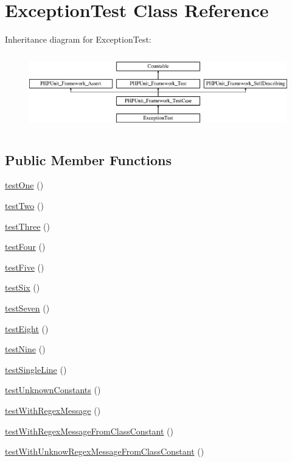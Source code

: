 \hypertarget{class_exception_test}{}\section{Exception\+Test Class Reference}
\label{class_exception_test}
Inheritance diagram for Exception\+Test\+:\begin{figure}[H]
\begin{center}
\leavevmode
\includegraphics[height=3.303835cm]{class_exception_test}
\end{center}
\end{figure}
\subsection*{Public Member Functions}
\begin{DoxyCompactItemize}
\item 
\mbox{\hyperlink{class_exception_test_afbf3ff88b322c6a7197ce02297cd23a0}{test\+One}} ()
\item 
\mbox{\hyperlink{class_exception_test_a4fb9974ce113d5d1db8075e0db0dc9b6}{test\+Two}} ()
\item 
\mbox{\hyperlink{class_exception_test_a0bd6c752e665cd0e690512ca38d15d41}{test\+Three}} ()
\item 
\mbox{\hyperlink{class_exception_test_a610ae959d988c18c588f47517f6a291f}{test\+Four}} ()
\item 
\mbox{\hyperlink{class_exception_test_a0756440631c4db21ab3607063465834a}{test\+Five}} ()
\item 
\mbox{\hyperlink{class_exception_test_ace022eea5b5fa83b441021bf6337a76b}{test\+Six}} ()
\item 
\mbox{\hyperlink{class_exception_test_afac89d452a2d5de36e0051d1ed758b24}{test\+Seven}} ()
\item 
\mbox{\hyperlink{class_exception_test_a9716ac1cbf30a1f6df13338c87f06191}{test\+Eight}} ()
\item 
\mbox{\hyperlink{class_exception_test_a80538b5f401ca6c091eabea9fb507c00}{test\+Nine}} ()
\item 
\mbox{\hyperlink{class_exception_test_a4c90a8d3690532dd044c150c200bd7da}{test\+Single\+Line}} ()
\item 
\mbox{\hyperlink{class_exception_test_a0d383ebd7331a18abac5d39ae6bb4159}{test\+Unknown\+Constants}} ()
\item 
\mbox{\hyperlink{class_exception_test_abb5d88655b5b54e3a739038e6f9b1f33}{test\+With\+Regex\+Message}} ()
\item 
\mbox{\hyperlink{class_exception_test_a6a4acf26cdeae50edc466d55bd5651e5}{test\+With\+Regex\+Message\+From\+Class\+Constant}} ()
\item 
\mbox{\hyperlink{class_exception_test_a70af11a9cde89b46892653dc75b1e739}{test\+With\+Unknow\+Regex\+Message\+From\+Class\+Constant}} ()
\end{DoxyCompactItemize}
